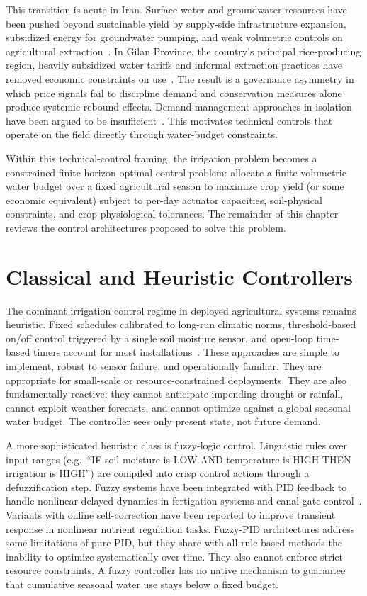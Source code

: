 This transition is acute in Iran. Surface water and groundwater
resources have been pushed beyond sustainable yield by supply-side
infrastructure expansion, subsidized energy for groundwater pumping,
and weak volumetric controls on agricultural
extraction~\cite{Mesgaran2018,Nouri2023,Behling2022}. In Gilan
Province, the country's principal rice-producing region, heavily
subsidized water tariffs and informal extraction practices have
removed economic constraints on
use~\cite{Mesgaran2018,PourgholamAmiji2024}. The result is a
governance asymmetry in which price signals fail to discipline demand
and conservation measures alone produce systemic rebound effects.
Demand-management approaches in isolation have been argued to be
insufficient~\cite{PerezBlanco2020,Hajirad2025,Hesabi2023}. This
motivates technical controls that operate on the field directly
through water-budget constraints.

Within this technical-control framing, the irrigation problem becomes
a constrained finite-horizon optimal control problem: allocate a
finite volumetric water budget over a fixed agricultural season to
maximize crop yield (or some economic equivalent) subject to per-day
actuator capacities, soil-physical constraints, and crop-physiological
tolerances. The remainder of this chapter reviews the control
architectures proposed to solve this problem.

\section{Classical and Heuristic Controllers}
\label{sec:lit-classical}

The dominant irrigation control regime in deployed agricultural
systems remains heuristic. Fixed schedules calibrated to long-run
climatic norms, threshold-based on/off control triggered by a single
soil moisture sensor, and open-loop time-based timers account for
most installations~\cite{Sharma2025,Bayar2025}. These approaches are
simple to implement, robust to sensor failure, and operationally
familiar. They are appropriate for small-scale or resource-constrained
deployments. They are also fundamentally reactive: they cannot
anticipate impending drought or rainfall, cannot exploit weather
forecasts, and cannot optimize against a global seasonal water
budget. The controller sees only present state, not future demand.

A more sophisticated heuristic class is fuzzy-logic control.
Linguistic rules over input ranges (e.g.\ ``IF soil moisture is LOW
AND temperature is HIGH THEN irrigation is HIGH'') are compiled into
crisp control actions through a defuzzification step. Fuzzy systems
have been integrated with PID feedback to handle nonlinear delayed
dynamics in fertigation systems and canal-gate
control~\cite{Sharma2025,Mahmud2026}. Variants with online
self-correction have been reported to improve transient response in
nonlinear nutrient regulation tasks. Fuzzy-PID architectures address
some limitations of pure PID, but they share with all rule-based
methods the inability to optimize systematically over time. They
also cannot enforce strict resource constraints. A fuzzy controller
has no native mechanism to guarantee that cumulative seasonal water
use stays below a fixed budget.

